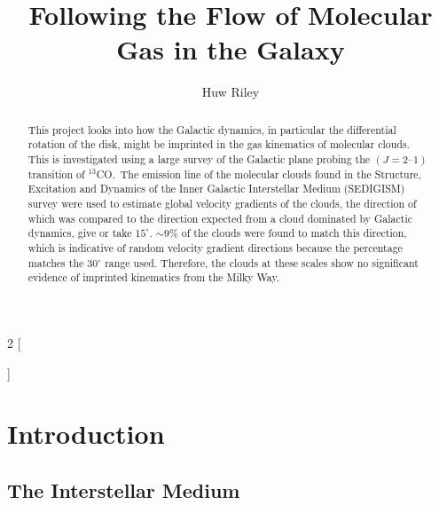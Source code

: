 \documentclass[a4paper,11pt]{article}
\begin{document}
\begin{multicols}{2}
[
\title{Following the Flow of Molecular Gas in the Galaxy}
\author{Huw Riley}
\date{}
\maketitle
\vspace{-1.5cm}
\begin{abstract}
\noindent This project looks into how the Galactic dynamics, in particular the differential rotation of the disk, might be imprinted in the gas kinematics of molecular clouds. This is investigated using a large survey of the Galactic plane probing the $(J\!=\!2\text{–}1)$ transition of $^{13}$CO.\ The emission line of the molecular clouds found in the Structure, Excitation and Dynamics of the Inner Galactic Interstellar Medium (SEDIGISM) survey were used to estimate global velocity gradients of the clouds, the direction of which was compared to the direction expected from a cloud dominated by Galactic dynamics, give or take $15^{\circ}$. $\sim9\%$ of the clouds were found to match this direction, which is indicative of random velocity gradient directions because the percentage matches the $30^{\circ}$ range used. Therefore, the clouds at these scales show no significant evidence of imprinted kinematics from the Milky Way. 
\end{abstract}
]


\section*{Introduction}

\subsection*{The Interstellar Medium}


\end{multicols}
\end{document}
